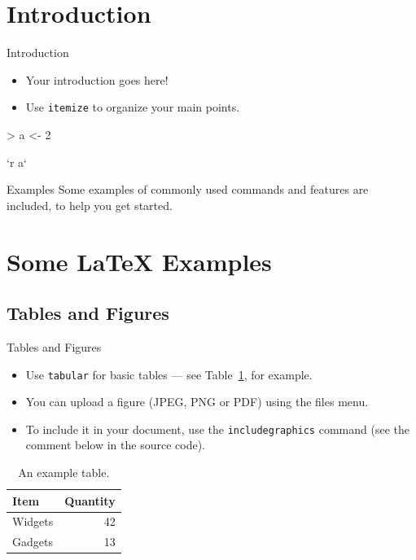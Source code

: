 \documentclass{beamer}
\begin{document}
\section{Introduction}



\begin{frame}[fragile]{Introduction}

\begin{itemize}
  \item Your introduction goes here!
  \item Use \texttt{itemize} to organize your main points.
\end{itemize}  


\begin{Schunk}
\begin{Sinput}
> a <- 2
\end{Sinput}
\end{Schunk}

`r a` 

\vskip 1cm

\begin{block}{Examples}
Some examples of commonly used commands and features are included, to help you get started.
\end{block}

\end{frame}

\section{Some \LaTeX{} Examples}

\subsection{Tables and Figures}

\begin{frame}{Tables and Figures}

\begin{itemize}
\item Use \texttt{tabular} for basic tables --- see Table~\ref{tab:widgets}, for example.
\item You can upload a figure (JPEG, PNG or PDF) using the files menu. 
\item To include it in your document, use the \texttt{includegraphics} command (see the comment below in the source code).
\end{itemize}


\begin{table}
\centering
\begin{tabular}{l|r}
Item & Quantity \\\hline
Widgets & 42 \\
Gadgets & 13
\end{tabular}
\caption{\label{tab:widgets}An example table.}
\end{table}

\end{frame}
\end{document}
